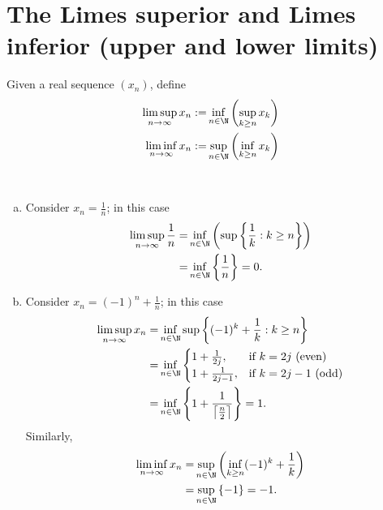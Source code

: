 \section{The Limes superior and Limes inferior (upper and lower limits)}
Given a real sequence \((x_n)\), define 
\begin{align*}
	\limsup_{n\to\infty}x_n:=&\inf_{n\in\N}\left(\sup_{k\geq n}x_k\right)\\
	\liminf_{n\to\infty}x_n:=&\sup_{n\in\N}\left(\inf_{k\geq n}x_k\right)
\end{align*}
\begin{example}~\newline
	\begin{enumerate}[(a)]
		\item Consider \(x_n=\displaystyle\frac{1}{n}\); in this case 
		\begin{align*}
			\limsup_{n\to\infty}\frac{1}{n}=&\inf_{n\in\N}\left(\sup\left\{\frac{1}{k}:k\geq n\right\}\right)\\
			=&\inf_{n\in\N}\left\{\frac{1}{n}\right\}=0.
		\end{align*}
		
		\item Consider \(x_n=(-1)^n+\displaystyle\frac{1}{n}\); in this case 
		\begin{align*}
			\limsup_{n\to\infty}x_n=&\inf_{n\in\N}\sup\left\{(-1)^k+\frac{1}{k}:k\geq n\right\}\\
			=&\inf_{n\in\N}\begin{cases}
											1+\frac{1}{2j},&\text{if}~k=2j~(\text{even})\\
											1+\frac{1}{2j-1},&\text{if}~k=2j-1~(\text{odd})
										\end{cases}\\
			 =&\inf_{n\in\N}\left\{1+\frac{1}{\left\lceil \frac{n}{2}\right\rceil} \right\}=1.
		\end{align*}
		Similarly, 
		\begin{align*}
			\liminf_{n\to\infty}x_n=&\sup_{n\in\N}\left(\inf_{k\geq n}(-1)^k+\frac{1}{k}\right)\\
			=&\sup_{n\in\N}\left\{-1\right\}=-1.
		\end{align*}
	\end{enumerate}
\end{example}